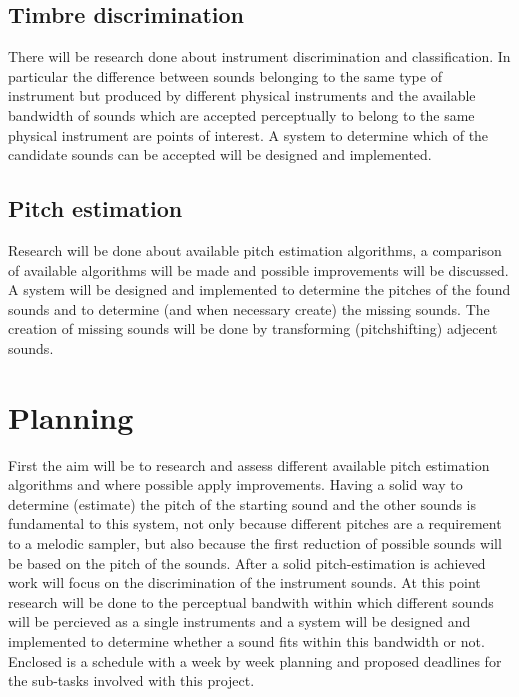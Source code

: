 \documentclass{article}
\begin{document}
    \subsection{Timbre discrimination}
        There will be research done about instrument discrimination and classification. In particular the difference between sounds belonging to the same type of instrument but produced by different physical instruments and the available bandwidth of sounds which are accepted perceptually to belong to the same physical instrument are points of interest. 
        A system to determine which of the candidate sounds can be accepted will be designed and implemented.
 
    \subsection{Pitch estimation}
        Research will be done about available pitch estimation algorithms, a comparison of available algorithms will be made and possible improvements will be discussed.
        A system will be designed and implemented to determine the pitches of the found sounds and to determine (and when necessary create) the missing sounds.
        The creation of missing sounds will be done by transforming (pitchshifting) adjecent sounds.

\section{Planning}
    First the aim will be to research and assess different available pitch estimation algorithms and where possible apply improvements. Having a solid way to determine (estimate) the pitch of the starting sound and the other sounds is fundamental to this system, not only because different pitches are a requirement to a melodic sampler, but also because the first reduction of possible sounds will be based on the pitch of the sounds.  
    After a solid pitch-estimation is achieved work will focus on the discrimination of the instrument sounds. At this point research will be done to the perceptual bandwith within which different sounds will be percieved as a single instruments and a system will be designed and implemented to determine whether a sound fits within this bandwidth or not.
    Enclosed is a schedule with a week by week planning and proposed deadlines for the sub-tasks involved with this project.
   
\end{document}
